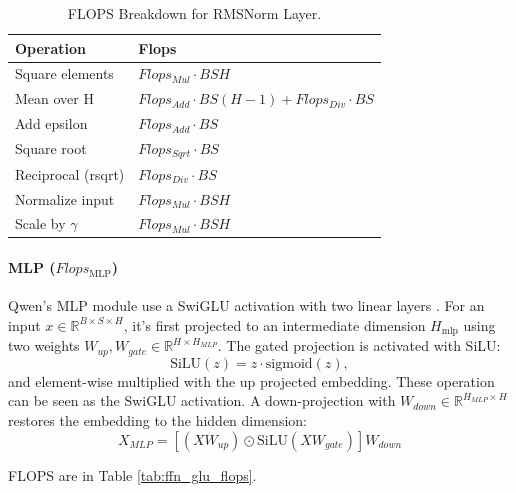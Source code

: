 \documentclass{article}
\begin{document}
\begin{table}[!thbp]
\renewcommand{\arraystretch}{1.4} \centering \setlength{\tabcolsep}{8pt}
\begin{tabular}{@{}ll@{}} %
    \toprule \textbf{Operation} & \textbf{Flops} \\ \midrule
    Square elements & $Flops_{Mul} \cdot BSH$ \\
    Mean over H & $Flops_{Add} \cdot BS(H - 1) + Flops_{Div} \cdot BS$ \\
    Add epsilon & $Flops_{Add} \cdot BS$ \\
    Square root & $Flops_{Sqrt} \cdot BS$ \\
    Reciprocal (rsqrt) & $Flops_{Div} \cdot BS$ \\
    Normalize input & $Flops_{Mul} \cdot BSH$ \\
    Scale by $\gamma$ & $Flops_{Mul} \cdot BSH$ \\
    \bottomrule
\end{tabular}
\caption{FLOPS Breakdown for RMSNorm Layer.} \label{tab:rmsnorm_flops}
\end{table}

\paragraph{MLP ($Flops_{\text{MLP}}$)}
Qwen's MLP module use a SwiGLU activation with two linear layers \cite{shazeer2020gluvariantsimprovetransformer}. For an input $x \in \mathbb{R}^{B \times S \times H}$, it's first projected to an intermediate dimension $H_{\text{mlp}}$ using two weights $W_{up}, W_{gate}\in \mathbb{R}^{H \times H_{MLP}}$. The gated projection is activated with SiLU:
$$
\text{SiLU}(z)=z\cdot\text{sigmoid}(z),
$$
and element-wise multiplied with the up projected embedding. These operation can be seen as the SwiGLU activation. A down-projection with $W_{down}\in \mathbb{R}^{ H_{MLP}\times H}$ restores the embedding to the hidden dimension:
\begin{equation}
    X_{MLP} = \left[ (X W_{up}) \odot \text{SiLU}(X W_{gate}) \right] W_{down}
\end{equation}

FLOPS are in Table \ref{tab:ffn_glu_flops}.
\end{document}
